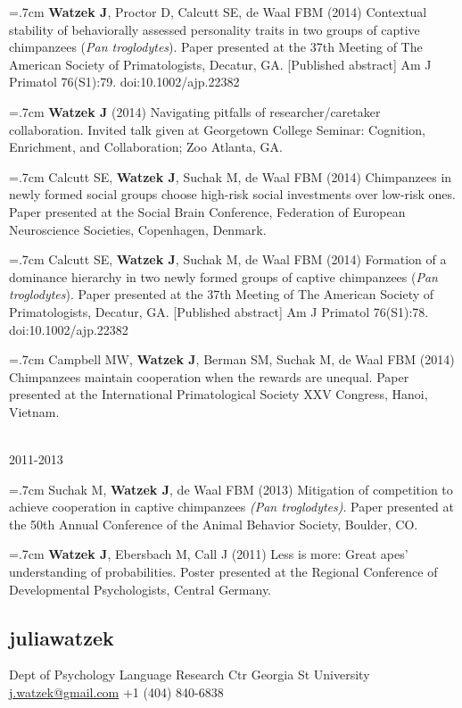 \documentclass[]{friggeri-cv}
\begin{document}
\hangindent=.7cm \textbf{Watzek J}, Proctor D, Calcutt SE, de Waal FBM (2014) Contextual stability of behaviorally assessed personality traits in two groups of captive chimpanzees (\emph{Pan troglodytes}). Paper presented at the 37th Meeting of The American Society of Primatologists, Decatur, GA. [Published abstract] Am J Primatol 76(S1):79. doi:10.1002/ajp.22382

\hangindent=.7cm \textbf{Watzek J} (2014) Navigating pitfalls of researcher/caretaker collaboration. Invited talk given at Georgetown College Seminar: Cognition, Enrichment, and Collaboration; Zoo Atlanta, GA.

\hangindent=.7cm Calcutt SE, \textbf{Watzek J}, Suchak M, de Waal FBM (2014) Chimpanzees in newly formed social groups choose high-risk social investments over low-risk ones. Paper presented at the Social Brain Conference, Federation of European Neuroscience Societies, Copenhagen, Denmark.

\hangindent=.7cm Calcutt SE, \textbf{Watzek J}, Suchak M, de Waal FBM (2014) Formation of a dominance hierarchy in two newly formed groups of captive chimpanzees (\emph{Pan troglodytes}). Paper presented at the 37th Meeting of The American Society of Primatologists, Decatur, GA. [Published abstract] Am J Primatol 76(S1):78. doi:10.1002/ajp.22382

\hangindent=.7cm Campbell MW, \textbf{Watzek J}, Berman SM, Suchak M, de Waal FBM (2014) Chimpanzees maintain cooperation when the rewards are unequal. Paper presented at the International Primatological Society XXV Congress, Hanoi, Vietnam.

{\large{} ~\\[-.15cm] 2011-2013}

\hangindent=.7cm Suchak M, \textbf{Watzek J}, de Waal FBM (2013) Mitigation of competition to achieve cooperation in captive chimpanzees \emph{(Pan troglodytes)}. Paper presented at the 50th Annual Conference of the Animal Behavior Society, Boulder, CO.

\hangindent=.7cm \textbf{Watzek J}, Ebersbach M, Call J (2011) Less is more: Great apes' understanding of probabilities. Poster presented at the Regional Conference of Developmental Psychologists, Central Germany.\\[-.1cm]


\begin{aside}
  \section{{\normalfont julia}watzek}
    Dept of Psychology
    Language Research Ctr
    Georgia St University
    ~
    \href{mailto:j.watzek@gmail.com}{j.watzek@gmail.com}
    +1 (404) 840-6838
\end{aside}
\end{document}
